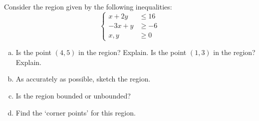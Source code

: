 \documentclass[11pt,letterpaper]{article}
\begin{document}

 Consider the region given by the following inequalities:
	\[
	\left\{
	\begin{aligned}
	x + 2y&\leq 16 \\
	-3x + y&\geq -6 \\
	x, y&\geq 0
	\end{aligned} \right.
	\]
\begin{enumerate}[(a)]
\item Is the point $(4, 5)$ in the region? Explain. Is the point $(1, 3)$ in the region? Explain. 
\item As accurately as possible, sketch the region.
\item Is the region bounded or unbounded?
\item Find the `corner points' for this region. 
\end{enumerate}
\end{document}
